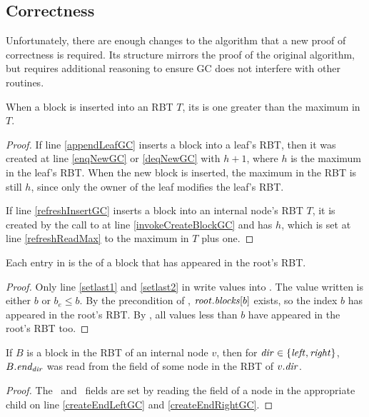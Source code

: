 \subsection{Correctness}
Unfortunately, there are enough changes to the algorithm that a new proof of correctness
is required.  Its structure mirrors the proof of the original algorithm, but requires additional
reasoning to ensure GC does not interfere with other routines.

\begin{observation}\label{RBTinsertions}
When a block is inserted into an RBT $T$, its  is one greater than the maximum  in $T$.
\end{observation}
\begin{proof}
If line \ref{appendLeafGC} inserts a block into a leaf's RBT, then it was created at 
line \ref{enqNewGC} or \ref{deqNewGC} with  $h+1$, where $h$ is the maximum 
in the leaf's RBT.  When the new block is inserted, the maximum  in the RBT is still $h$,
since only the owner of the leaf modifies the leaf's RBT.

If line \ref{refreshInsertGC} inserts a block  into an internal node's RBT $T$,
it is created by the call to  at line \ref{invokeCreateBlockGC} and 
has  $h$, which is set at line \ref{refreshReadMax} to  the maximum  in $T$ plus one.
\end{proof}

\begin{observation}\label{lastinroot}
Each entry in  is the  of a block that has appeared in the root's RBT.
\end{observation}
\begin{proof}
Only line \ref{setlast1} and \ref{setlast2} in  write values into .
The value written is either $b$ or $b_e \leq b$.
By the precondition of , $\mbox{\textnormal{\textit{root}}}.\mbox{\textit{blocks}}[b]$ exists, so the index $b$ has appeared
in the root's RBT.
By , all values less than $b$ have appeared in the root's RBT too.
\end{proof}

\begin{observation}
\label{edirGC} 
If $B$ is a block in the RBT of an internal node $v$, then for $\mbox{\textnormal{\textit{dir}}} \in \{\mbox{\textit{left}},\mbox{\textit{right}}\}$,
$B.\mbox{\textit{end\textsubscript{dir}}}$ was read from the  field of some node in the RBT of $v.\mbox{\textnormal{\textit{dir}}}$.
\end{observation}
\begin{proof}
The \eleft\ and \eright\ fields are set by reading the  field of a node in the appropriate child
on line \ref{createEndLeftGC} and \ref{createEndRightGC}.
\end{proof}

